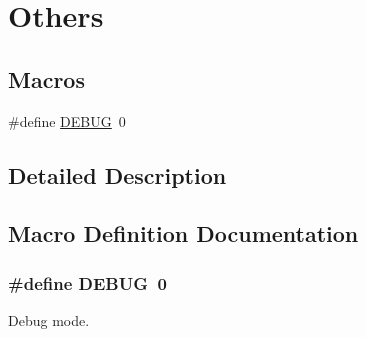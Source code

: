 \hypertarget{group___oth}{\section{Others}
\label{group___oth}
}
\subsection*{Macros}
\begin{DoxyCompactItemize}
\item 
\#define \hyperlink{group___oth_gad72dbcf6d0153db1b8d8a58001feed83}{D\-E\-B\-U\-G}~0
\end{DoxyCompactItemize}


\subsection{Detailed Description}


\subsection{Macro Definition Documentation}
\hypertarget{group___oth_gad72dbcf6d0153db1b8d8a58001feed83}{
\subsubsection[{D\-E\-B\-U\-G}]{\setlength{\rightskip}{0pt plus 5cm}\#define D\-E\-B\-U\-G~0}}\label{group___oth_gad72dbcf6d0153db1b8d8a58001feed83}
Debug mode. 